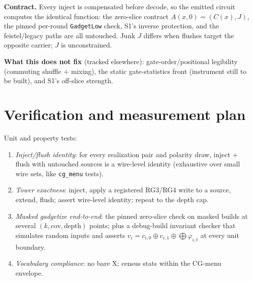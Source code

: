 \documentclass[11pt]{article}
\newcommand{\code}[1]{\texttt{#1}}
\begin{document}
\textbf{Contract.} Every inject is compensated before decode, so the
emitted circuit computes the identical function: the zero-slice contract
$A(x,0) = (C(x), J)$, the pinned per-round \code{GadgetLow} check, S1's
inverse protection, and the feistel/legacy paths are all untouched. Junk
$J$ differs when flushes target the opposite carrier; $J$ is
unconstrained.

\textbf{What this does not fix} (tracked elsewhere): gate-order/positional
legibility (commuting shuffle $+$ mixing), the static gate-statistics
front (instrument still to be built), and S1's off-slice strength.

\section{Verification and measurement plan}

Unit and property tests:
\begin{enumerate}
\item \emph{Inject/flush identity}: for every realization pair and
polarity draw, inject $+$ flush with untouched sources is a wire-level
identity (exhaustive over small wire sets, like \code{cg\_menu} tests).
\item \emph{Tower exactness}: inject, apply a registered RG3/RG4 write to
a source, extend, flush; assert wire-level identity; repeat to the depth
cap.
\item \emph{Masked gadgetize end-to-end}: the pinned zero-slice check on
masked builds at several $(k, \text{cov}, \text{depth})$ points; plus a
debug-build invariant checker that simulates random inputs and asserts
$v_i = c_{i,0} \oplus c_{i,1} \oplus \bigoplus \varphi_{i,t}$ at every
unit boundary.
\item \emph{Vocabulary compliance}: no bare X; census stats within the
CG-menu envelope.
\end{enumerate}
\end{document}
